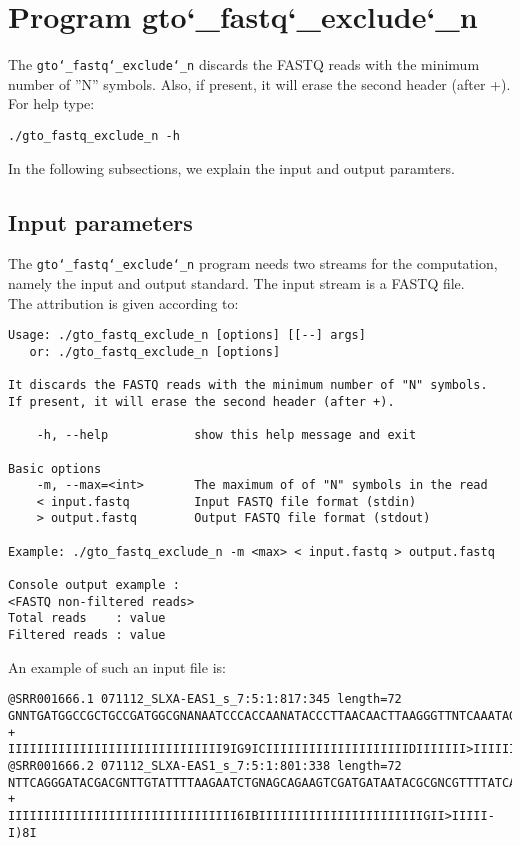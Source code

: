 \section{Program gto\char`_fastq\char`_exclude\char`_n}
The \texttt{gto\char`_fastq\char`_exclude\char`_n} discards the FASTQ reads with the minimum number of ''N'' symbols. Also, if present, it will erase the second header (after +).\\
For help type:
\begin{lstlisting}
./gto_fastq_exclude_n -h
\end{lstlisting}
In the following subsections, we explain the input and output paramters.

\subsection*{Input parameters}

The \texttt{gto\char`_fastq\char`_exclude\char`_n} program needs two streams for the computation, namely the input and output standard. The input stream is a FASTQ file.\\
The attribution is given according to:
\begin{lstlisting}
Usage: ./gto_fastq_exclude_n [options] [[--] args]
   or: ./gto_fastq_exclude_n [options]

It discards the FASTQ reads with the minimum number of "N" symbols. 
If present, it will erase the second header (after +).

    -h, --help            show this help message and exit

Basic options
    -m, --max=<int>       The maximum of of "N" symbols in the read
    < input.fastq         Input FASTQ file format (stdin)
    > output.fastq        Output FASTQ file format (stdout)

Example: ./gto_fastq_exclude_n -m <max> < input.fastq > output.fastq

Console output example :
<FASTQ non-filtered reads>
Total reads    : value
Filtered reads : value
\end{lstlisting}
An example of such an input file is:
\begin{lstlisting}
@SRR001666.1 071112_SLXA-EAS1_s_7:5:1:817:345 length=72
GNNTGATGGCCGCTGCCGATGGCGNANAATCCCACCAANATACCCTTAACAACTTAAGGGTTNTCAAATAGA
+
IIIIIIIIIIIIIIIIIIIIIIIIIIIIII9IG9ICIIIIIIIIIIIIIIIIIIIIDIIIIIII>IIIIII/
@SRR001666.2 071112_SLXA-EAS1_s_7:5:1:801:338 length=72
NTTCAGGGATACGACGNTTGTATTTTAAGAATCTGNAGCAGAAGTCGATGATAATACGCGNCGTTTTATCAN
+
IIIIIIIIIIIIIIIIIIIIIIIIIIIIIIII6IBIIIIIIIIIIIIIIIIIIIIIIIGII>IIIII-I)8I
\end{lstlisting}


